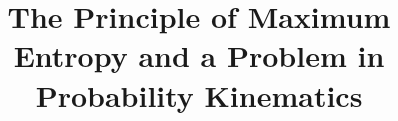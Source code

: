 \documentclass[12pt]{article}
\begin{document}
\title{The Principle of Maximum Entropy and a Problem in Probability Kinematics}

\author{}
\date{}

\maketitle

\doublespacing


\setcounter{chap}{1}


\end{document}
